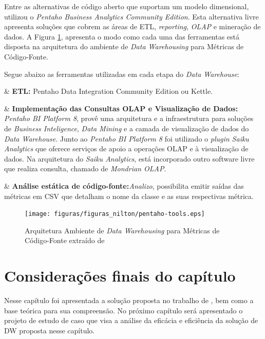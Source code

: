 Entre as alternativas de código aberto que suportam um modelo dimensional,   utilizou o \textit{Pentaho Business Analytics Community Edition}. Esta alternativa livre apresenta soluções que cobrem as áreas de ETL, \textit{reporting}, \textit{OLAP} e mineração de dados. A Figura \ref{fig:arquiteturaAmbiente}, apresenta o modo como cada uma das ferramentas está disposta na arquitetura do ambiente de \textit{Data Warehousing} para Métricas de Código-Fonte.

Segue abaixo as ferramentas utilizadas em cada etapa do \textit{Data Warehouse}:

\begin{easylist}[itemize]

	& \textbf{ETL:} Pentaho Data Integration Community Edition ou Kettle.
	 
	& \textbf{Implementação das Consultas OLAP e Visualização de Dados:} \textit{Pentaho BI Platform 8}, provê uma arquitetura e a infraestrutura para soluções de \textit{Business Inteligence}, \textit{Data Mining} e a camada de visualização de dados do \textit{Data Warehouse}. Junto ao \textit{Pentaho BI Platform 8} foi utilizado o \textit{plugin Saiku Analytics} que oferece serviços de apoio a operações OLAP e à visualização de dados. Na arquitetura do \textit{Saiku Analytics}, está incorporado outro software livre que realiza consulta, chamado de \textit{Mondrian OLAP}. 
	
	& \textbf{Análise estática de código-fonte:}\textit{Analizo}, possibilita emitir saídas das métricas em CSV que detalham o nome da classe e as suas respectivas métrica.

	\end{easylist}
	
	\begin{figure}[h!]
\centering
\texttt{[image: figuras/figuras\_nilton/pentaho-tools.eps]}
\caption{Arquitetura Ambiente de \textit{Data Warehousing} para Métricas de Código-Fonte extraído de }
\label{fig:arquiteturaAmbiente}
\end{figure}
\FloatBarrier

\section{Considerações finais do capítulo}

Nesse capítulo foi apresentada a solução proposta no trabalho de , bem como a base teórica para sua compreensão. No próximo capítulo será apresentado o projeto de estudo de caso que visa a análise da eficácia e eficiência da solução de DW proposta nesse capítulo.
